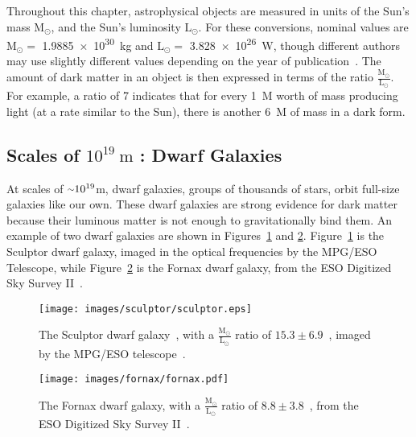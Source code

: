 Throughout this chapter, astrophysical objects are measured in units of the Sun's mass $\textrm{M}_\odot$, and the Sun's luminosity $\textrm{L}_\odot$.
For these conversions, nominal values are $\textrm{M}_\odot =$ \SI{1.9885e30}{kg} and $\textrm{L}_\odot =$ \SI{3.828e26}{W}, though different authors may use slightly different values depending on the year of publication~\cite{iau_solarconstants}.
The amount of dark matter in an object is then expressed in terms of the ratio $\frac{\textrm{M}_\odot}{\textrm{L}_\odot}$.
For example, a ratio of \SI{7}{} indicates that for every \SI{1}{M_\odot} worth of mass producing light (at a rate similar to the Sun), there is another \SI{6}{M_\odot} of mass in a dark form.
  
\subsection{Scales of $10^{19}\:\text{m}$ : Dwarf Galaxies}\label{dm_dwarfscale}
At scales of $\nicetilde 10^{19}$m, dwarf galaxies, groups of thousands of stars, orbit full-size galaxies like our own.
These dwarf galaxies are strong evidence for dark matter because their luminous matter is not enough to gravitationally bind them.
An example of two dwarf galaxies are shown in Figures~\ref{fig:sculptor} and \ref{fig:fornax}.
Figure~\ref{fig:sculptor} is the Sculptor dwarf galaxy, imaged in the optical frequencies by the MPG/ESO Telescope, while Figure~\ref{fig:fornax} is the Fornax dwarf galaxy, from the ESO Digitized Sky Survey II~\cite{fornax_image}.

\begin{figure}[!ht]
  \centering
  \texttt{[image: images/sculptor/sculptor.eps]}
  \caption[Sculptor Dwarf Galaxy]{
    The Sculptor dwarf galaxy~\cite{sculptor_image}, with a $\frac{\textrm{M}_\odot}{\textrm{L}_\odot}$ ratio of $15.3\pm6.9$~\cite{sculptor_ml}, imaged by the MPG/ESO telescope~\cite{sculptor_paper}.
  }
  \label{fig:sculptor}
\end{figure}

\begin{figure}[!ht]
  \centering
  \texttt{[image: images/fornax/fornax.pdf]}
  \caption[Fornax Dwarf Galaxy]{
    The Fornax dwarf galaxy, with a $\frac{\textrm{M}_\odot}{\textrm{L}_\odot}$ ratio of $8.8\pm3.8$~\cite{sculptor_ml}, from the ESO Digitized Sky Survey II~\cite{fornax_image}.
  }
  \label{fig:fornax}
\end{figure}

